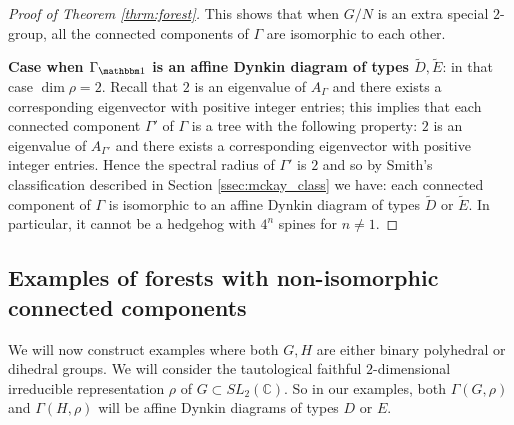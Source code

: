 \documentclass[ALCO]{cedram}
\newcommand{\triv}{{\mathbbm 1}}
\begin{document}
\begin{proof}[Proof of Theorem \ref{thrm:forest}]
This shows that when $G/N$ is an extra special $2$-group, all the connected components of $\Gamma$ are isomorphic to each other. 



{\bf Case when $\Gamma_{\triv}$ is an affine Dynkin diagram of types $\tilde{D}, \tilde{E}$}: in that case $\dim \rho = 2$. {Recall that $2$ is an eigenvalue of $A_{\Gamma}$ and there exists a corresponding eigenvector with positive integer entries; this implies that} each connected component $\Gamma'$ of $\Gamma$ is a tree with the following property: $2$ is an eigenvalue of $A_{\Gamma'}$ and there exists a corresponding eigenvector with positive integer entries. Hence the spectral radius of $\Gamma'$ is $2$ and so by Smith's classification \cite{Smith} described in Section \ref{ssec:mckay_class} we have: each connected component of $\Gamma$ is isomorphic to an affine Dynkin diagram of types $\tilde{D}$ or $\tilde{E}$. In particular, it cannot be a hedgehog with ${4}^n$ spines for $n\neq 1$. 

\end{proof}
\subsection{Examples of forests with non-isomorphic connected components}\label{ssec:forest_examples}


We will now construct examples where both $G, H$ are either binary polyhedral or dihedral groups. We will consider the tautological faithful $2$-dimensional irreducible representation $\rho$ of $G\subset SL_2(\mathbb{C})$. {So in our examples, both} $\Gamma(G, \rho)$ and $\Gamma(H, \rho)$ {will be} affine Dynkin diagrams of types $D$ or $E$.
\end{document}
